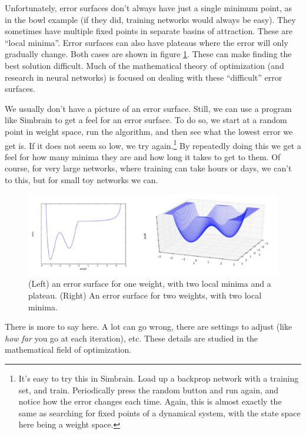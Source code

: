 {%
Unfortunately, error surfaces don't always have just a single minimum point, as in the bowl example (if they did, training networks would always be easy). They sometimes have multiple fixed points in separate basins of attraction. These are ``local minima''. Error surfaces can also have plateaus where the error will only gradually change. Both cases are shown in figure \ref{local_minima}. These can make finding the best solution difficult. Much of the mathematical theory of optimization (and  research in neural networks) is focused on dealing with these ``difficult'' error surfaces.

We usually don't have a picture of an error surface. Still, we can use a program like Simbrain to get a feel for an error surface. To do so, we start at a random point in weight space, run the algorithm, and then see what the lowest error we get is. If it does not seem so low, we try again.\footnote{It's easy to try this in Simbrain. Load up a backprop network with a training set, and train. Periodically press the random button and run again, and notice how the error changes each time. Again, this is almost exactly the same as searching for fixed points of a dynamical system,  with the state space here being a weight space.} By repeatedly doing this we get a feel for how many minima they are and how long it takes to get to them. Of course, for very  large networks, where training can take hours or days, we can't to this, but for small toy networks we can.

\begin{figure}[h]
\centering
\includegraphics[scale=.4]{./images/LocalMinima1d2d.png}
\caption[Jeff Yoshimi and Scott Hotton.]{(Left) an error surface for one weight, with two local minima and a plateau. (Right) An error surface for two weights, with two local minima.}
\label{local_minima}
\end{figure}

 There is more to say here. A lot can go wrong, there are settings to adjust (like \emph{how far} you go at each iteration), etc. These details are studied in the mathematical field of optimization. 
 
}
